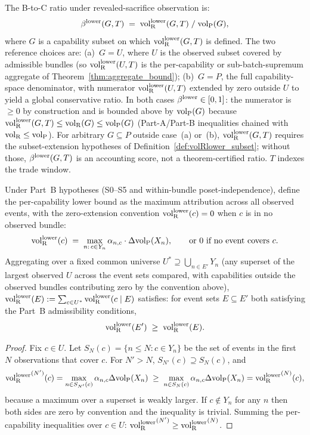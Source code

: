 \begin{definition}
\label{def:btoc_ratio}
The B-to-C ratio under revealed-sacrifice observation is:
\[
  \beta^{\mathrm{lower}}(G, T) \;=\; {\operatorname{vol}_{\mathrm{R}}^{\mathrm{lower}}}(G, T) \;/\; {\operatorname{vol}_{\mathrm{P}}}(G),
\]
where $G$ is a capability subset on which ${\operatorname{vol}_{\mathrm{R}}^{\mathrm{lower}}}(G, T)$ is
defined.  The two reference choices are:
(a)~$G = U$, where $U$ is the observed subset covered by
admissible bundles (so ${\operatorname{vol}_{\mathrm{R}}^{\mathrm{lower}}}(U, T)$ is the per-capability
or sub-batch-supremum aggregate of
Theorem~\ref{thm:aggregate_bound});
(b)~$G = P$, the full capability-space denominator, with
numerator ${\operatorname{vol}_{\mathrm{R}}^{\mathrm{lower}}}(U, T)$ extended by zero outside $U$ to
yield a global conservative ratio.  In both cases
$\beta^{\mathrm{lower}} \in [0, 1]$: the numerator is $\geq 0$ by construction
and is bounded above by ${\operatorname{vol}_{\mathrm{P}}}(G)$ because ${\operatorname{vol}_{\mathrm{R}}^{\mathrm{lower}}}(G, T)
\leq {\operatorname{vol}_{\mathrm{R}}}(G) \leq {\operatorname{vol}_{\mathrm{P}}}(G)$ (Part-A/Part-B inequalities chained
with ${\operatorname{vol}_{\mathrm{R}}} \leq {\operatorname{vol}_{\mathrm{P}}}$).  For arbitrary $G \subseteq P$ outside
case~(a) or~(b), ${\operatorname{vol}_{\mathrm{R}}^{\mathrm{lower}}}(G, T)$ requires the subset-extension
hypotheses of Definition~\ref{def:volRlower_subset}; without
those, $\beta^{\mathrm{lower}}(G, T)$ is an accounting score, not a
theorem-certified ratio.  $T$ indexes the trade window.
\end{definition}

\begin{proposition}
\label{prop:monotone}
Under Part~B hypotheses (S0--S5 and within-bundle
poset-independence), define the per-capability lower bound as
the maximum attribution across all observed events, with the
zero-extension convention ${\operatorname{vol}_{\mathrm{R}}^{\mathrm{lower}}}(c) = 0$ when $c$ is in
no observed bundle:
\[
  {\operatorname{vol}_{\mathrm{R}}^{\mathrm{lower}}}(c) \;=\;
  \max_{n:\, c \in Y_n} \alpha_{n,c} \cdot \Delta{\operatorname{vol}_{\mathrm{P}}}(X_n),
  \qquad
  \text{or } 0 \text{ if no event covers } c.
\]
Aggregating over a fixed common universe $U^* \supseteq
\bigcup_{n \in E'} Y_n$ (any superset of the largest observed
$U$ across the event sets compared, with capabilities outside
the observed bundles contributing zero by the convention
above), ${\operatorname{vol}_{\mathrm{R}}^{\mathrm{lower}}}(E) := \sum_{c \in U^*} {\operatorname{vol}_{\mathrm{R}}^{\mathrm{lower}}}(c \mid E)$
satisfies: for event sets $E \subseteq E'$ both satisfying
the Part~B admissibility conditions,
\[
  {\operatorname{vol}_{\mathrm{R}}^{\mathrm{lower}}}(E') \;\geq\; {\operatorname{vol}_{\mathrm{R}}^{\mathrm{lower}}}(E).
\]
\end{proposition}

\begin{proof}
Fix $c \in U$.  Let $S_N(c) = \{n \leq N : c \in Y_n\}$ be the
set of events in the first $N$ observations that cover $c$.  For
$N' > N$, $S_{N'}(c) \supseteq S_N(c)$, and
\[
  {\operatorname{vol}_{\mathrm{R}}^{\mathrm{lower}}}^{(N')}(c)
  = \max_{n \in S_{N'}(c)} \alpha_{n,c} \Delta{\operatorname{vol}_{\mathrm{P}}}(X_n)
  \;\geq\;
  \max_{n \in S_N(c)} \alpha_{n,c} \Delta{\operatorname{vol}_{\mathrm{P}}}(X_n)
  = {\operatorname{vol}_{\mathrm{R}}^{\mathrm{lower}}}^{(N)}(c),
\]
because a maximum over a superset is weakly larger.  If
$c \notin Y_n$ for any $n$ then both sides are zero by convention
and the inequality is trivial.  Summing the per-capability
inequalities over $c \in U$:
${\operatorname{vol}_{\mathrm{R}}^{\mathrm{lower}}}^{(N')} \geq {\operatorname{vol}_{\mathrm{R}}^{\mathrm{lower}}}^{(N)}$.
\end{proof}

